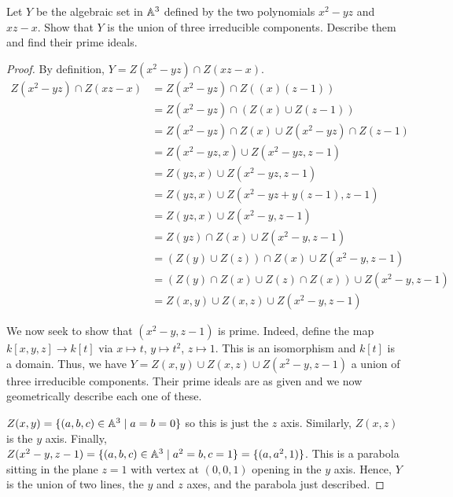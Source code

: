 \label{1.1.3}

Let $Y$ be the algebraic set in $\mathbb A^3$ defined by the two polynomials $x^2 - yz$ and $xz - x$. Show that $Y$ is the union of three irreducible components. Describe them and find their prime ideals.

\begin{proof}
    By definition, $Y = Z(x^2 - yz) \cap Z(xz - x)$.
    \begin{align*}
        Z(x^2 - yz) \cap Z(xz - x) &= Z(x^2 - yz) \cap Z((x)(z - 1))\\
        &= Z(x^2 - yz) \cap (Z(x) \cup Z(z - 1))\\
        &= Z(x^2 - yz) \cap Z(x) \cup Z(x^2 - yz) \cap Z(z - 1)\\
        &= Z(x^2 - yz, x) \cup Z(x^2 - yz, z - 1)\\
        &= Z(yz, x) \cup Z(x^2 - yz, z - 1)\\
        &= Z(yz, x) \cup Z(x^2 - yz + y(z - 1), z - 1)\\
        &= Z(yz, x) \cup Z(x^2 - y, z - 1)\\
        &= Z(yz) \cap Z(x) \cup Z(x^2 - y, z - 1)\\
        &= (Z(y) \cup Z(z)) \cap Z(x) \cup Z(x^2 - y, z - 1)\\
        &= (Z(y) \cap Z(x) \cup Z(z) \cap Z(x)) \cup Z(x^2 - y, z - 1)\\
        &= Z(x, y) \cup Z(x, z) \cup Z(x^2 - y, z - 1)
    \end{align*}
    
    We now seek to show that $(x^2 - y, z - 1)$ is prime. Indeed, define the map $k[x, y, z] \longrightarrow k[t]$ via $x \mapsto t$, $y \mapsto t^2$, $z \mapsto 1$. This is an isomorphism and $k[t]$ is a domain. Thus, we have $Y = Z(x, y) \cup Z(x, z) \cup Z(x^2 - y, z - 1)$ a union of three irreducible components. Their prime ideals are as given and we now geometrically describe each one of these.
    
    $Z(x, y) = \{(a, b, c) \in \mathbb A^3 \mid a = b = 0\}$ so this is just the $z$ axis. Similarly, $Z(x, z)$ is the $y$ axis. Finally, $Z(x^2 - y, z - 1) = \{(a, b, c) \in \mathbb A^3 \mid a^2 = b, c = 1\} = \{(a, a^2, 1)\}$. This is a parabola sitting in the plane $z = 1$ with vertex at $(0, 0, 1)$ opening in the $y$ axis. Hence, $Y$ is the union of two lines, the $y$ and $z$ axes, and the parabola just described.
\end{proof}